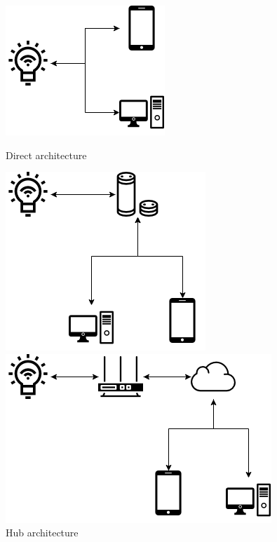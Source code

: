 \begin{figure}[ht] 
    \begin{minipage}[b]{0.5\linewidth}
        \centering
        \includegraphics[width=0.6\linewidth]{images/iot-architectures/direct.png}
        \caption{Direct architecture}\label{fig:arch-direct}
        \vspace{4ex}
    \end{minipage}%
    \begin{minipage}[b]{0.5\linewidth}
        \centering
        \includegraphics[width=0.6\linewidth]{images/iot-architectures/hub.png}
        \caption{Hub architecture}\label{fig:arch-hub}
        \vspace{4ex}
    \end{minipage} 
    \begin{minipage}[b]{0.5\linewidth}
        \centering
        \includegraphics[width=0.8\linewidth]{images/iot-architectures/cloud.png}

\end{minipage}
\end{figure}
